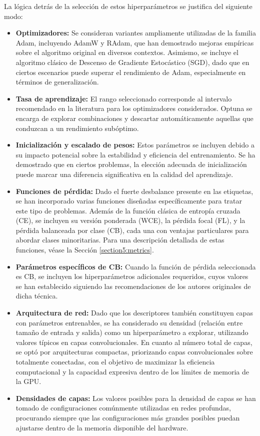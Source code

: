 La lógica detrás de la selección de estos hiperparámetros se justifica del siguiente modo:
\begin{itemize}
    \item \textbf{Optimizadores:} Se consideran variantes ampliamente utilizadas de la familia Adam, incluyendo AdamW y RAdam, que han demostrado mejoras empíricas sobre el algoritmo original en diversos contextos. Asimismo, se incluye el algoritmo clásico de Descenso de Gradiente Estocástico (SGD), dado que en ciertos escenarios puede superar el rendimiento de Adam, especialmente en términos de generalización.
    \item \textbf{Tasa de aprendizaje:} El rango seleccionado corresponde al intervalo recomendado en la literatura para los optimizadores considerados. Optuna se encarga de explorar combinaciones y descartar automáticamente aquellas que conduzcan a un rendimiento subóptimo. 
    \item \textbf{Inicialización y escalado de pesos:} Estos parámetros se incluyen debido a su impacto potencial sobre la estabilidad y eficiencia del entrenamiento. Se ha demostrado que en ciertos problemas, la elección adecuada de inicialización puede marcar una diferencia significativa en la calidad del aprendizaje.
    \item \textbf{Funciones de pérdida:} Dado el fuerte desbalance presente en las etiquetas, se han incorporado varias funciones diseñadas específicamente para tratar este tipo de problemas. Además de la función clásica de entropía cruzada (CE), se incluyen su versión ponderada (WCE), la pérdida focal (FL), y la pérdida balanceada por clase (CB), cada una con ventajas particulares para abordar clases minoritarias. Para una descripción detallada de estas funciones, véase la Sección \ref{section5:metrics}.
    \item \textbf{Parámetros específicos de CB:} Cuando la función de pérdida seleccionada es CB, se incluyen los hiperparámetros adicionales requeridos, cuyos valores se han establecido siguiendo las recomendaciones de los autores originales de dicha técnica.
    \item \textbf{Arquitectura de red:} Dado que los descriptores también constituyen capas con parámetros entrenables, se ha considerado su densidad (relación entre tamaño de entrada y salida) como un hiperparámetro a explorar, utilizando valores típicos en capas convolucionales. En cuanto al número total de capas, se optó por arquitecturas compactas, priorizando capas convolucionales sobre totalmente conectadas, con el objetivo de maximizar la eficiencia computacional y la capacidad expresiva dentro de los límites de memoria de la GPU.
    \item \textbf{Densidades de capas:} Los valores posibles para la densidad de capas se han tomado de configuraciones comúnmente utilizadas en redes profundas, procurando siempre que las configuraciones más grandes posibles puedan ajustarse dentro de la memoria disponible del hardware.
\end{itemize}
